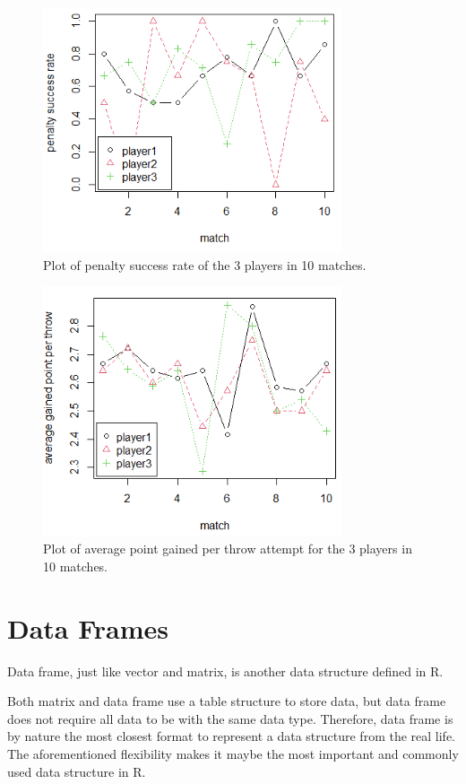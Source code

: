 \begin{figure}
	\centering
	\includegraphics[width=250pt]{chapters/ch-r/figures/basket_exp1.png}
	\caption{Plot of penalty success rate of the 3 players in 10 matches.} \label{ch:r1:fig:basket_exp1}
\end{figure}

\begin{figure}
	\centering
	\includegraphics[width=250pt]{chapters/ch-r/figures/basket_exp2.png}
	\caption{Plot of average point gained per throw attempt for the 3 players in 10 matches.} \label{ch:r1:fig:basket_exp2}
\end{figure}

\section{Data Frames} \label{ch:r1:sec:df}

Data frame, just like vector and matrix, is another data structure defined in R.

Both matrix and data frame use a table structure to store data, but data frame does not require all data to be with the same data type. Therefore, data frame is by nature the most closest format to represent a data structure from the real life. The aforementioned flexibility makes it maybe the most important and commonly used data structure in R.

